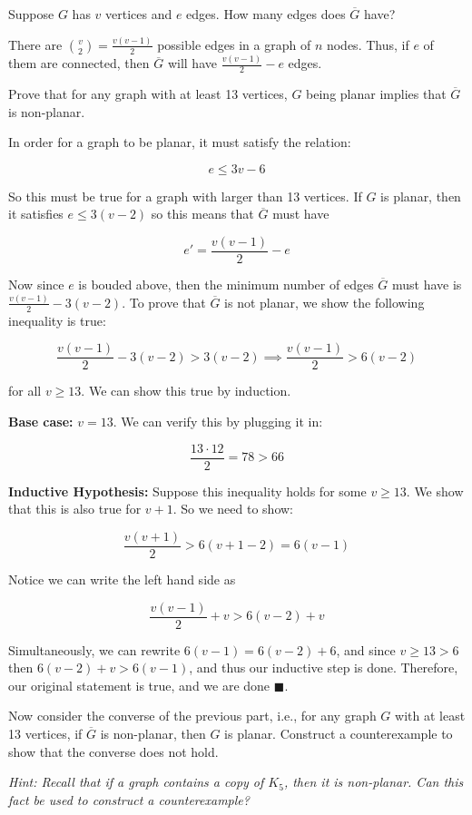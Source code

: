 \documentclass[11pt]{article}
\begin{document}
\begin{Parts}

\Part Suppose $G$ has $v$ vertices and $e$ edges.  How many edges does $\overline{G}$ have?


\begin{solution}
    There are ${v \choose 2} = \frac{v(v-1)}{2}$ possible edges in a graph of $n$ nodes. Thus, if $e$ of them are connected, then $\overline G$ will have $\frac{v(v-1)}{2} - e$ edges.
\end{solution}
\Part Prove that for any graph with at least 13 vertices, $G$ being planar implies that $\overline{G}$ is non-planar.

\begin{solution}
    In order for a graph to be planar, it must satisfy the relation:

    \[ e \leq 3v - 6\]

    So this must be true for a graph with larger than 13 vertices. If $G$ is planar, then it satisfies $e \leq 3(v - 2)$ so this means that $\overline G$ must have 

    \[ e' = \frac{v(v-1)}{2} - e\] 

    Now since $e$ is bouded above, then the minimum number of edges $\overline G$ must have is $\frac{v(v-1)}{2} - 3(v-2)$. To prove that $\overline G$ is not planar, we show the following inequality is true:

    \[ \frac{v(v-1)}{2} - 3(v-2) > 3(v-2) \implies \frac{v(v-1)}{2} > 6(v-2)\]

    for all $v \geq 13$. We can show this true by induction. 

    \textbf{Base case:} $v = 13$. We can verify this by plugging it in:

    \[\frac{13 \cdot 12}{2} = 78 > 66\]

    \textbf{Inductive Hypothesis:} Suppose this inequality holds for some $v \geq 13$. We show that this is also true for $v+1$. So we need to show:

    \[ \frac{v(v+1)}{2} > 6(v+1-2) = 6(v-1) \]

    Notice we can write the left hand side as 

    \[ \frac{v(v-1)}{2} + v > 6(v - 2) + v\] 

    Simultaneously, we can rewrite $6(v-1) = 6(v-2) + 6$, and since $v \geq 13 > 6$ then $6(v-2) + v > 6(v-1)$, and thus our inductive step is done. Therefore, our original statement is true, and we are done $\blacksquare$.




\end{solution}

\Part Now consider the converse of the previous part, i.e., for any graph $G$ with at least 13 vertices, if $\overline{G}$ is non-planar, then $G$ is planar. Construct a counterexample to show that the converse does not hold.

\textit{Hint: Recall that if a graph contains a copy of $K_5$, then it is non-planar. Can this fact be used to construct a counterexample?}

\end{Parts}
\pagebreak
{} 
\end{document}
